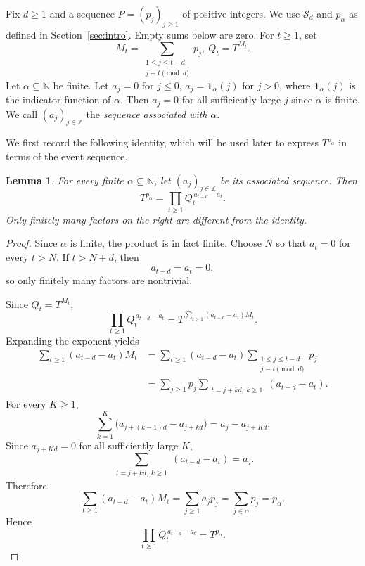 \documentclass[11pt]{amsart}
\newtheorem{lemma}[theorem]{Lemma}
\theoremstyle{definition}
\theoremstyle{remark}
\newcommand{\N}{\mathbb N}
\newcommand{\Z}{\mathbb Z}
\newcommand{\Sd}{\mathcal S_d}
\newcommand{\one}{\mathbf 1}
\begin{document}
\medskip

Fix $d\geq1$ and a sequence $P=(p_j)_{j\geq1}$ of positive integers.  We use
$\Sd$ and $p_\alpha$ as defined in Section~\ref{sec:intro}.  Empty sums below are zero.  For $t\geq1$, set
\[
  M_t=\sum_{\substack{1\leq j\leq t-d\\ j\equiv t\pmod d}}p_j,
 \  Q_t=T^{M_t}.  
\]
Let $\alpha\subseteq\N$ be finite.  
Let $a_j=0$ for $j\leq0$, $a_j=\one_\alpha(j)$ for $j>0$, where 
$\one_\alpha(j)$ is the indicator function of $\alpha$.
Then $a_j=0$ for all sufficiently large $j$ since $\alpha$ is finite. We call $(a_j)_{j\in\Z}$ the \emph{sequence associated with} $\alpha$.

 

We first record the following identity, which will be used later to express $T^{p_\alpha}$ in terms of the event sequence.

\begin{lemma}\label{lem:telescope}
For every finite $\alpha\subseteq\N$, let $(a_j)_{j\in\Z}$ be its associated sequence. Then
\[
 T^{p_\alpha}=\prod_{t\geq1} Q_t^{\,a_{t-d}-a_t}.   
\]
Only finitely many factors on the right are different from the identity.
\end{lemma}

\begin{proof}
Since $\alpha$ is finite, the product is in fact finite.
Choose $N$ so that $a_t=0$ for every $t>N$.  If $t>N+d$, then
\[
 a_{t-d}=a_t=0,
\]
so only finitely many factors are nontrivial.

Since $Q_t=T^{M_t}$, %
\[
 \prod_{t\geq1} Q_t^{\,a_{t-d}-a_t}
 =T^{\sum_{t\geq1}(a_{t-d}-a_t)M_t}.
\]
Expanding the exponent yields 
\[
\begin{aligned}
 \sum_{t\geq1}(a_{t-d}-a_t)M_t
 &=\sum_{t\geq1}(a_{t-d}-a_t)
   \sum_{\substack{1\leq j\leq t-d\\ j\equiv t\pmod d}}p_j\\
 &=\sum_{j\geq1}p_j
   \sum_{\substack{t= j+kd, \ k\ge 1 }}
   (a_{t-d}-a_t).
\end{aligned}
\]
For every $K\geq1$,
\[
 \sum_{k=1}^{K}
 \bigl(a_{j+(k-1)d}-a_{j+kd}\bigr)
 =a_j-a_{j+Kd}.
\]
Since $a_{j+Kd}=0$ for all sufficiently large $K$,
\[
 \sum_{\substack{t= j+kd, \ k\ge 1}}
 (a_{t-d}-a_t)=a_j.
\]
Therefore
\[
 \sum_{t\geq1}(a_{t-d}-a_t)M_t= \sum_{j\geq1}a_jp_j=\sum_{j\in\alpha}p_j =p_\alpha. 
\]
Hence
\[
 \prod_{t\geq1} Q_t^{\,a_{t-d}-a_t}=T^{p_\alpha}.
\]
\end{proof}
\end{document}
